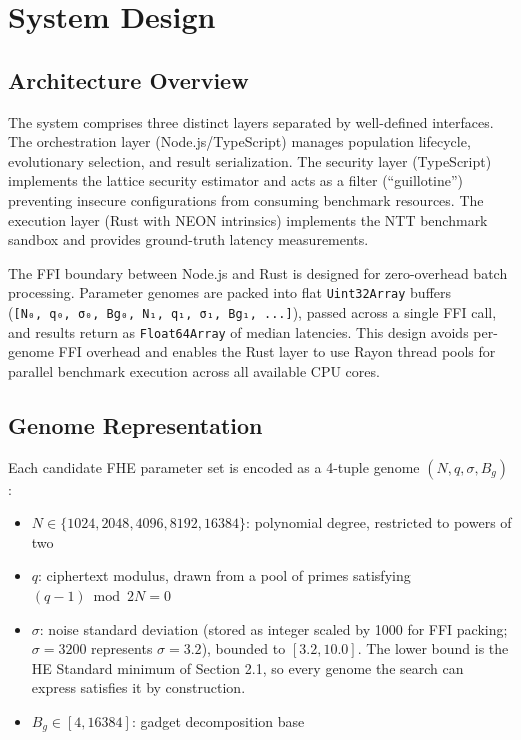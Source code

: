 \section{System Design}\label{system-design}

\subsection{Architecture Overview}\label{architecture-overview}

The system comprises three distinct layers separated by well-defined interfaces. The orchestration layer (Node.js/TypeScript) manages population lifecycle, evolutionary selection, and result serialization. The security layer (TypeScript) implements the lattice security estimator and acts as a filter (``guillotine'') preventing insecure configurations from consuming benchmark resources. The execution layer (Rust with NEON intrinsics) implements the NTT benchmark sandbox and provides ground-truth latency measurements.

The FFI boundary between Node.js and Rust is designed for zero-overhead batch processing. Parameter genomes are packed into flat \texttt{Uint32Array} buffers (\texttt{{[}N₀,\ q₀,\ σ₀,\ Bg₀,\ N₁,\ q₁,\ σ₁,\ Bg₁,\ ...{]}}), passed across a single FFI call, and results return as \texttt{Float64Array} of median latencies. This design avoids per-genome FFI overhead and enables the Rust layer to use Rayon thread pools for parallel benchmark execution across all available CPU cores.

\subsection{Genome Representation}\label{genome-representation}

Each candidate FHE parameter set is encoded as a 4-tuple genome \((N, q, \sigma, B_g)\):

\begin{itemize}
\tightlist
\item
  \(N \in \{1024, 2048, 4096, 8192, 16384\}\): polynomial degree, restricted to powers of two
\item
  \(q\): ciphertext modulus, drawn from a pool of primes satisfying \((q - 1) \bmod 2N = 0\)
\item
  \(\sigma\): noise standard deviation (stored as integer scaled by 1000 for FFI packing; \(\sigma = 3200\) represents \(\sigma = 3.2\)), bounded to \([3.2, 10.0]\). The lower bound is the HE Standard minimum of Section 2.1, so every genome the search can express satisfies it by construction.
\item
  \(B_g \in [4, 16384]\): gadget decomposition base
\end{itemize}

